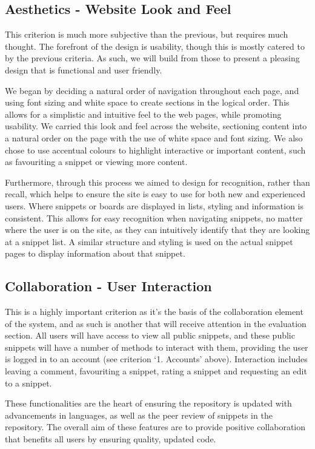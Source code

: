 \subsection{Aesthetics - Website Look and Feel}

This criterion is much more subjective than the previous, but requires much thought.
The forefront of the design is usability, though this is mostly catered to by the previous criteria. 
As such, we will build from those to present a pleasing design that is functional and user friendly. 

We began by deciding a natural order of navigation throughout each page, and using font sizing and white space to create sections in the logical order. 
This allows for a simplistic and intuitive feel to the web pages, while promoting usability. 
We carried this look and feel across the website, sectioning content into a natural order on the page with the use of white space and font sizing. 
We also chose to use accentual colours to highlight interactive or important content, such as favouriting a snippet or viewing more content.

Furthermore, through this process we aimed to design for recognition, rather than recall, which helps to ensure the site is easy to use for both new and experienced users.
Where snippets or boards are displayed in lists, styling and information is consistent.
This allows for easy recognition when navigating snippets, no matter where the user is on the site, as they can intuitively  identify that they are looking at a snippet list.
A similar structure and styling is used on the actual snippet pages to display information about that snippet. 

\subsection{Collaboration - User Interaction}

This is a highly important criterion as it's the basis of the collaboration element of the system, and as such is another that will receive attention in the evaluation section. 
All users will have access to view all public snippets, and these public snippets will have a number of methods to interact with them, providing the user is logged in to an account (see criterion `1. Accounts' above).
Interaction includes leaving a comment, favouriting a snippet, rating a snippet and requesting an edit to a snippet. 

These functionalities are the heart of ensuring the repository is updated with advancements in languages, as well as the peer review of snippets in the repository.
The overall aim of these features are to provide positive collaboration that benefits all users by ensuring quality, updated code.

